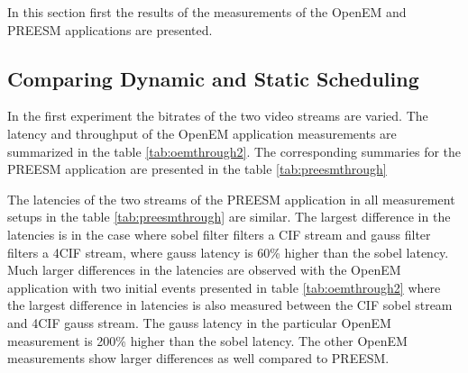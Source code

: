 In this section first the results of the measurements of the OpenEM and PREESM applications are presented.

\subsection{Comparing Dynamic and Static Scheduling}
\label{subsec:first-experiment}
\FloatBarrier
In the first experiment the bitrates of the two video streams are varied. The latency and throughput of the OpenEM application measurements are summarized in the table \ref{tab:oemthrough2}. The corresponding summaries for the PREESM application are presented in the table \ref{tab:preesmthrough} 

The latencies of the two streams of the PREESM application in all measurement setups in the table \ref{tab:preesmthrough} are similar. The largest difference in the latencies is in the case where sobel filter filters a CIF stream and gauss filter filters a 4CIF stream, where gauss latency is 60\% higher than the sobel latency. Much larger differences in the latencies are observed with the OpenEM application with two initial events presented in table \ref{tab:oemthrough2} where the largest difference in latencies is also measured between the CIF sobel stream and 4CIF gauss stream. The gauss latency in the particular OpenEM measurement is 200\% higher than the sobel latency. The other OpenEM measurements show larger differences as well compared to PREESM.

